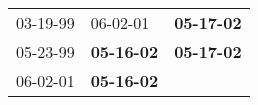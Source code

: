 \begin{supertabular}{p{0.33\columnwidth}p{0.33\columnwidth}p{0.33\columnwidth}}
 03-19-99\textsuperscript{} &           06-02-01\textsuperscript{} &  \textbf{05-17-02\textsuperscript{}} \\
 05-23-99\textsuperscript{} &  \textbf{05-16-02\textsuperscript{}} &  \textbf{05-17-02\textsuperscript{}} \\
 06-02-01\textsuperscript{} &  \textbf{05-16-02\textsuperscript{}} &                                      \\
\end{supertabular}
